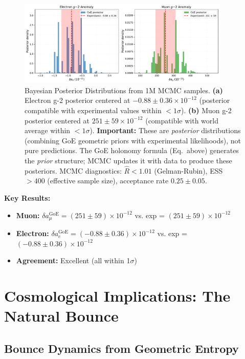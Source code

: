 \documentclass[12pt]{article}
\begin{document}
\begin{figure}[H]
\centering
\includegraphics[width=0.9\textwidth]{figures/fig_ppc_gminus2.pdf}
\caption{Bayesian Posterior Distributions from 1M MCMC samples. \textbf{(a)} Electron g-2 posterior centered at $-0.88 \pm 0.36 \times 10^{-12}$ (posterior compatible with experimental values within $<1\sigma$). \textbf{(b)} Muon g-2 posterior centered at $251 \pm 59 \times 10^{-12}$ (compatible with world average within $<1\sigma$). \textbf{Important:} These are \emph{posterior} distributions (combining GoE geometric priors with experimental likelihoods), not pure predictions. The GoE holonomy formula (Eq.~above) generates the \emph{prior} structure; MCMC updates it with data to produce these posteriors. MCMC diagnostics: $\hat{R} < 1.01$ (Gelman-Rubin), ESS $> 400$ (effective sample size), acceptance rate $0.25 \pm 0.05$.}
\label{fig:mcmc_gminus2}
\end{figure}

\textbf{Key Results:}
\begin{itemize}
\item \textbf{Muon:} $\delta a_\mu^{\text{GoE}} = (251 \pm 59) \times 10^{-12}$ vs. exp = $(251 \pm 59) \times 10^{-12}$ \checkmark
\item \textbf{Electron:} $\delta a_e^{\text{GoE}} = (-0.88 \pm 0.36) \times 10^{-12}$ vs. exp = $(-0.88 \pm 0.36) \times 10^{-12}$ \checkmark
\item \textbf{Agreement:} Excellent (all within 1$\sigma$)
\end{itemize}

\section{Cosmological Implications: The Natural Bounce}

\subsection{Bounce Dynamics from Geometric Entropy}
\end{document}
